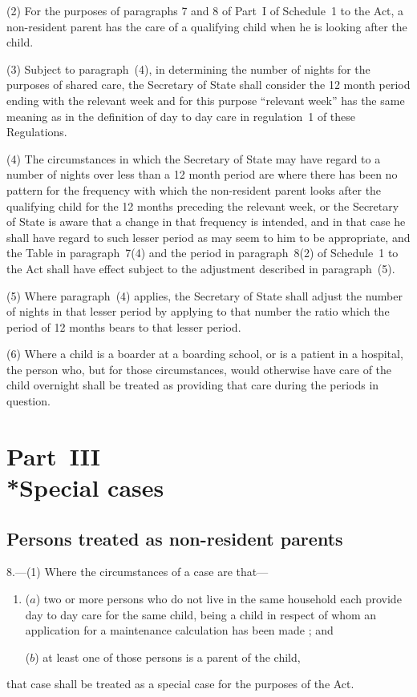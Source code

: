 \documentclass[12pt,a4paper]{article}
\begin{document}
(2) For the purposes of paragraphs 7 and 8 of Part~I of Schedule~1 to the Act, a non-resident parent has the care of a qualifying child when he is looking after the child.

(3) Subject to paragraph~(4), in determining the number of nights for the purposes of shared care, the Secretary of State shall consider the 12 month period ending with the relevant week and for this purpose “relevant week” has the same meaning as in the definition of day to day care in regulation~1 of these Regulations.

(4) The circumstances in which the Secretary of State may have regard to a number of nights over less than a 12 month period are where there has been no pattern for the frequency with which the non-resident parent looks after the qualifying child for the 12 months preceding the relevant week, or the Secretary of State is aware that a change in that frequency is intended, and in that case he shall have regard to such lesser period as may seem to him to be appropriate, and the Table in paragraph~7(4) and the period in paragraph~8(2) of Schedule~1 to the Act shall have effect subject to the adjustment described in paragraph~(5).

(5) Where paragraph~(4) applies, the Secretary of State shall adjust the number of nights in that lesser period by applying to that number the ratio which the period of 12 months bears to that lesser period.

(6) Where a child is a boarder at a boarding school, or is a patient in a hospital, the person who, but for those circumstances, would otherwise have care of the child overnight shall be treated as providing that care during the periods in question.

\section[Part~III --- Special cases]{Part~III\\*Special cases}

\renewcommand\parthead{--- Part~III}

\subsection[8. Persons treated as non-resident parents]{Persons treated as non-resident parents}

8.---(1)  Where the circumstances of a case are that—
\begin{enumerate}\item[]
($a$) two or more persons who do not live in the same household each provide day to day care for the same 
child, being a child in respect of whom an application for a maintenance calculation has been made%
; and

($b$) at least one of those persons is a parent of the child,
\end{enumerate}
that case shall be treated as a special case for the purposes of the Act.
\end{document}
